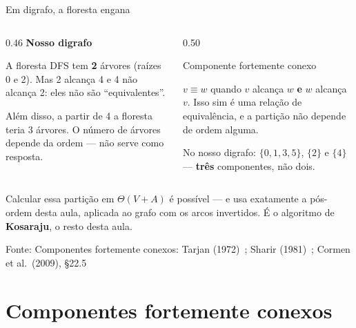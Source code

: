 \documentclass[aspectratio=169]{beamer}
\newcommand{\fonte}[1]{\vfill{\tiny\color{gray!60!black}Fonte: #1\par}}
\begin{document}
\begin{frame}{Em digrafo, a floresta engana}
  \begin{columns}[T]
    \begin{column}{0.46\textwidth}
      {\small \textbf{Nosso digrafo}}

      \medskip
      {\scriptsize A floresta DFS tem \textbf{2} árvores (raízes 0 e 2). Mas 2
      alcança 4 e 4 não alcança 2: eles não são ``equivalentes''.

      \medskip
      Além disso, a partir de 4 a floresta teria 3 árvores. O número de árvores
      depende da ordem --- não serve como resposta.}
    \end{column}
    \begin{column}{0.50\textwidth}
      \begin{block}{Componente fortemente conexo}
        {\scriptsize $v \equiv w$ quando $v$ alcança $w$ \textbf{e} $w$ alcança
        $v$. Isso sim é uma relação de equivalência, e a partição não depende de
        ordem alguma.

        \medskip
        No nosso digrafo: $\{0,1,3,5\}$, $\{2\}$ e $\{4\}$ --- \textbf{três}
        componentes, não dois.}
      \end{block}
    \end{column}
  \end{columns}
  \medskip
  {\scriptsize Calcular essa partição em $\Theta(V+A)$ é possível --- e usa
  exatamente a pós-ordem desta aula, aplicada ao grafo com os arcos invertidos.
  É o algoritmo de \textbf{Kosaraju}, o resto desta aula.}
  \fonte{Componentes fortemente conexos: Tarjan (1972)~\cite{tarjan1972depth}; Sharir (1981)~\cite{sharir1981strong}; Cormen et al.\ (2009), \S 22.5~\cite{cormen2009introduction}}
\end{frame}

\section{Componentes fortemente conexos}
\end{document}
